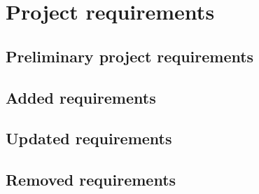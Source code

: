 \section{Project requirements}

\subsection{Preliminary project requirements}









\subsection{Added requirements}

\subsection{Updated requirements}

\subsection{Removed requirements}
